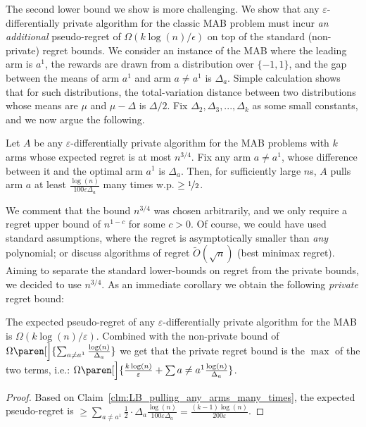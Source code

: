\documentclass{article}
\DeclarePairedDelimiter{\paren}()
\begin{document}
The second lower bound we show is more challenging. We show that any $\varepsilon$-differentially private algorithm for the classic MAB problem must incur \emph{an additional} pseudo-regret of $\Omega( k\log(n)/\epsilon)$ on top of the standard (non-private) regret bounds.  We consider an instance of the MAB where the leading arm is $a^1$, the rewards are drawn from a distribution over $\{-1,1\}$, and the gap between the means of arm $a^1$ and arm $a\neq a^1$ is $\Delta_a$. Simple calculation shows that for such distributions, the total-variation distance between two distributions whose means are $\mu$ and $\mu-\Delta$ is $\Delta/2$. Fix $\Delta_2, \Delta_3,...,\Delta_k$ as some small constants, and we now argue the following.
\begin{claim}
\label{clm:LB_pulling_any_arms_many_times}
Let $A$ be any $\varepsilon$-differentially private algorithm for the MAB problems with $k$ arms whose expected regret is at most $n^{3/4}$. Fix any arm $a\neq a^1$, whose difference between it and the optimal arm $a^1$ is $\Delta_a$. Then, for sufficiently large $n$s, $A$ pulls arm $a$ at least $\tfrac {\log(n)}{100\varepsilon\Delta_a}$ many times w.p. $\geq \nicefrac 1 2$.
\end{claim}
We comment that the bound $n^{3/4}$ was chosen arbitrarily, and we only require a regret upper bound of $n^{1-c}$ for some $c>0$. Of course, we could have used standard assumptions, where the regret is asymptotically smaller than \emph{any} polynomial; or discuss algorithms of regret $\tilde O(\sqrt n)$ (best minimax regret). Aiming to separate the standard lower-bounds on regret from the private bounds, we decided to use $n^{3/4}$.
As an immediate corollary we obtain the following \emph{private} regret bound:
\begin{corollary}
\label{cor:LB_private_MAB}
The expected pseudo-regret of any $\varepsilon$-differentially private algorithm for the MAB is $\Omega(k\log(n)/\varepsilon)$. Combined with the non-private bound of $\Omega\paren[\Big]{\sum_{a\neq a^1} \tfrac{\log(n)}{\Delta_a}}$ we get that the private regret bound is the $\max$ of the two terms, i.e.: $\Omega\paren[\Big]{\tfrac {k\log(n)}{\varepsilon}+\sum{a\neq a^1} \tfrac{\log(n)}{\Delta_a}}$.
\end{corollary}
{
  \vspace{-5mm}
  \begin{proof}
    Based on Claim~\ref{clm:LB_pulling_any_arms_many_times}, the expected pseudo-regret is $\geq \sum_{a\neq a^1} \tfrac 1 2 \cdot \Delta_a \tfrac{\log(n)}{100 \varepsilon\Delta_a} = \tfrac{(k-1)\log(n)}{200\varepsilon}$.
  \end{proof}
  \vspace{-6mm}
}
\end{document}
